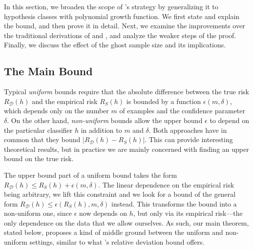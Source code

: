 \documentclass[twoside,11pt]{article}
\newcommand{\abs}[1]{\left|#1\right|}
\newcommand{\D}{\mathcal{D}}
\begin{document}
In this section, we broaden the scope of \citeauthor{langford05}'s strategy by generalizing it to hypothesis classes with polynomial growth function.
We first state and explain the bound, and then prove it in detail.
Next, we examine the improvements over the traditional derivations of \cite{vapnik98} and \cite{as-93}, and analyze the weaker steps of the proof.
Finally, we discuss the effect of the ghost sample size and its implications.

\subsection{The Main Bound}


Typical \emph{uniform} bounds require that the absolute difference between the true risk $R_\D(h)$ and the empirical risk $R_S(h)$ is bounded by a function $\epsilon(m, \delta)$, which depends only on the number $m$ of examples and the confidence parameter $\delta$.
On the other hand, \emph{non-uniform} bounds allow the upper bound $\epsilon$ to depend on the particular classifier $h$ in addition to $m$ and $\delta$.
Both approaches have in common that they bound $\abs{R_\D(h)-R_S(h)}$.
This can provide interesting theoretical results, but in practice we are mainly concerned with finding an upper bound on the true risk.

The upper bound part of a uniform bound takes the form $R_\D(h) \le R_S(h) + \epsilon(m, \delta)$.
The linear dependence on the empirical risk being arbitrary, we lift this constraint and we look for a bound of the general form $R_\D(h) \le \epsilon(R_S(h), m, \delta)$ instead.
This transforms the bound into a non-uniform one, since $\epsilon$ now depends on $h$, but only via its empirical risk---the only dependence on the data that we allow ourselves.
As such, our main theorem, stated below, proposes a kind of middle ground between the uniform and non-uniform settings, similar to what \citeauthor{vapnik98}'s relative deviation bound offers.
\end{document}
